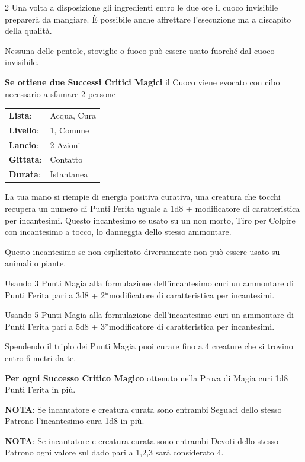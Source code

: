 \begin{multicols}{2}
Una volta a disposizione gli ingredienti entro le due ore il cuoco invisibile preparerà da mangiare. È possibile anche affrettare l'esecuzione ma a discapito della qualità.

Nessuna delle pentole, stoviglie o fuoco può essere usato fuorché dal cuoco invisibile.

\textbf{Se ottiene due Successi Critici Magici} il Cuoco viene evocato con cibo necessario a sfamare 2 persone

\noindent\begin{tabularx}{\linewidth}{p{1.9cm}X}
	\rowcolor{gray!20}\textbf{Lista}: & Acqua, Cura \\
	\textbf{Livello}: & 1, Comune \\
	\rowcolor{gray!20}\textbf{Lancio}: & 2 Azioni \\
	\textbf{Gittata}: & Contatto \\
	\rowcolor{gray!20}\textbf{Durata}: & Istantanea \\
\end{tabularx}\smallskip

La tua mano si riempie di energia positiva curativa, una creatura che tocchi recupera un numero di Punti Ferita uguale a 1d8 + modificatore di caratteristica per incantesimi. Questo incantesimo se usato su un non morto, Tiro per Colpire con incantesimo a tocco, lo danneggia dello stesso ammontare.

Questo incantesimo se non esplicitato diversamente non può essere usato su animali o piante.

Usando 3 Punti Magia alla formulazione dell'incantesimo curi un ammontare di Punti Ferita pari a 3d8 + 2*modificatore di caratteristica per incantesimi.

Usando 5 Punti Magia alla formulazione dell'incantesimo curi un ammontare di Punti Ferita pari a 5d8 + 3*modificatore di caratteristica per incantesimi.

Spendendo il triplo dei Punti Magia puoi curare fino a 4 creature che si trovino entro 6 metri da te.

\textbf{Per ogni Successo Critico Magico} ottenuto nella Prova di Magia curi 1d8 Punti Ferita in più.

\textbf{NOTA}: Se incantatore e creatura curata sono entrambi Seguaci dello stesso Patrono l'incantesimo cura 1d8 in più.

\textbf{NOTA}: Se incantatore e creatura curata sono entrambi Devoti dello stesso Patrono ogni valore sul dado pari a 1,2,3 sarà considerato 4.


\end{multicols}
